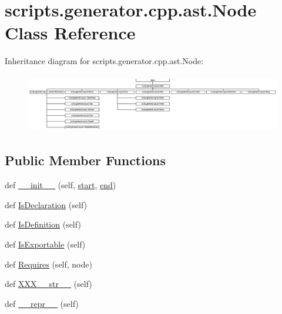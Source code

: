 \hypertarget{classscripts_1_1generator_1_1cpp_1_1ast_1_1_node}{}\section{scripts.\+generator.\+cpp.\+ast.\+Node Class Reference}
\label{classscripts_1_1generator_1_1cpp_1_1ast_1_1_node}
Inheritance diagram for scripts.\+generator.\+cpp.\+ast.\+Node\+:\begin{figure}[H]
\begin{center}
\leavevmode
\includegraphics[height=2.553192cm]{d2/dec/classscripts_1_1generator_1_1cpp_1_1ast_1_1_node}
\end{center}
\end{figure}
\subsection*{Public Member Functions}
\begin{DoxyCompactItemize}
\item 
def \mbox{\hyperlink{classscripts_1_1generator_1_1cpp_1_1ast_1_1_node_a2fb8663ae0868eea076a5eca6eaa7ca3}{\+\_\+\+\_\+init\+\_\+\+\_\+}} (self, \mbox{\hyperlink{classscripts_1_1generator_1_1cpp_1_1ast_1_1_node_a27ce0a583baee598b75ac6dd21f8575b}{start}}, \mbox{\hyperlink{classscripts_1_1generator_1_1cpp_1_1ast_1_1_node_a8e3394f9dd405352610ff9be4f284e2c}{end}})
\item 
def \mbox{\hyperlink{classscripts_1_1generator_1_1cpp_1_1ast_1_1_node_a47bce3a2a7212267bc0171fff16fc459}{Is\+Declaration}} (self)
\item 
def \mbox{\hyperlink{classscripts_1_1generator_1_1cpp_1_1ast_1_1_node_a53663c2acef5d6954d065e11d2fd53a1}{Is\+Definition}} (self)
\item 
def \mbox{\hyperlink{classscripts_1_1generator_1_1cpp_1_1ast_1_1_node_a298c446d34e08a78b5ebb477eb55863b}{Is\+Exportable}} (self)
\item 
def \mbox{\hyperlink{classscripts_1_1generator_1_1cpp_1_1ast_1_1_node_a37c4215d199947155270a485a3add21e}{Requires}} (self, node)
\item 
def \mbox{\hyperlink{classscripts_1_1generator_1_1cpp_1_1ast_1_1_node_a67044d136ea23484bddd6d3161f5474e}{X\+X\+X\+\_\+\+\_\+str\+\_\+\+\_\+}} (self)
\item 
def \mbox{\hyperlink{classscripts_1_1generator_1_1cpp_1_1ast_1_1_node_a6224ac9db2cbd5f3ce4a810b0275797d}{\+\_\+\+\_\+repr\+\_\+\+\_\+}} (self)
\end{DoxyCompactItemize}
